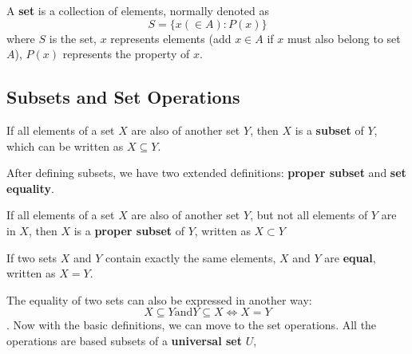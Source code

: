 A \textbf{set} is a collection of elements, normally denoted as
$$
S = \{x (\in A):P(x)\}
$$
where $S$ is the set, $x$ represents elements (add $x\in A$ if $x$ must also belong to set $A$), $P(x)$ represents the property of $x$.

\subsection{Subsets and Set Operations}
\begin{definition}
    If all elements of a set $X$ are also of another set $Y$, then $X$ is a \textbf{subset} of $Y$, which can be written as $X\subseteq Y$.
\end{definition}

After defining subsets, we have two extended definitions: \textbf{proper subset} and \textbf{set equality}.
\begin{definition}
    If all elements of a set $X$ are also of another set $Y$, but not all elements of $Y$ are in $X$, then $X$ is a \textbf{proper subset} of $Y$, written as $X \subset Y$
\end{definition}
\begin{definition}
    If two sets $X$ and $Y$ contain exactly the same elements, $X$ and $Y$ are \textbf{equal}, written as $X=Y$.
\end{definition}

The equality of two sets can also be expressed in another way: $$ X\subseteq Y \text{and} Y\subseteq X \Leftrightarrow X=Y$$.
Now with the basic definitions, we can move to the set operations. All the operations are based subsets of a \textbf{universal set} $U$,